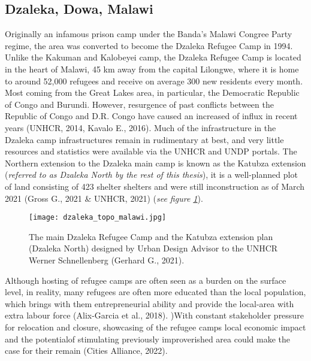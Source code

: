 \documentclass[11pt, a4paper, twoside]{report}
\begin{document}
\newpage

\subsection{Dzaleka, Dowa, Malawi}\label{Dzaleka}

Originally an infamous prison camp under the Banda's Malawi Congree Party regime, the area was converted to become the Dzaleka Refugee Camp in 1994. Unlike the Kakuman and Kalobeyei camp, the Dzaleka Refugee Camp is located in the heart of Malawi, 45 km away from the capital Lilongwe, where it is home to around 52,000 refugees and receive on average 300 new residents every month. Most coming from the Great Lakes area, in particular, the Democratic Republic of Congo and Burundi. However, resurgence of past conflicts between the Republic of Congo and D.R. Congo have caused an increased of influx in recent years (UNHCR, 2014, Kavalo E., 2016). Much of the infrastructure in the Dzaleka camp infrastructures remain in rudimentary at best, and very little resources and statistics were available via the UNHCR and UNDP portals. The Northern extension to the Dzaleka main camp is known as the Katubza extension (\textit{referred to as Dzaleka North by the rest of this thesis}), it is a well-planned plot of land consisting of 423 shelter shelters and were still inconstruction as of March 2021 (Gross G., 2021 \& UNHCR, 2021) (\textit{see figure \ref{fig:DZ_KA_PLAN}}).\\\par

\begin{figure}[H]
\centering
\texttt{[image: dzaleka\_topo\_malawi.jpg]}
  \caption{The main Dzaleka Refugee Camp and the Katubza extension plan (Dzaleka North) designed by Urban Design Advisor to the UNHCR Werner Schnellenberg (Gerhard G., 2021).}
\label{fig:DZ_KA_PLAN}
\end{figure}

Although hosting of refugee camps are often seen as a burden on the surface level, in reality, many refugees are often more educated than the local population, which brings with them entrepreneurial ability and provide the local-area with extra labour force (Alix-Garcia et al., 2018). )With constant stakeholder pressure for relocation and closure, showcasing of the refugee camps local economic impact and the potentialof stimulating previously improverished area could make the case for their remain (Cities Alliance, 2022).

\newpage
\end{document}
